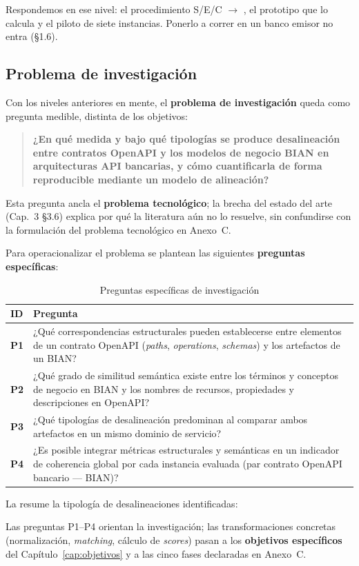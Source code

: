 Respondemos en ese nivel: el procedimiento S/E/C $\rightarrow$ \AlignmentScore{}, el prototipo
que lo calcula y el piloto de siete instancias. Ponerlo a correr en un banco emisor no entra
(§1.6).

\subsection{Problema de investigación}

Con los niveles anteriores en mente, el \textbf{problema de investigación} queda como pregunta
medible, distinta de los objetivos:

\begin{quote}
  \textbf{¿En qué medida y bajo qué tipologías se produce desalineación entre contratos OpenAPI y
  los modelos de negocio BIAN en arquitecturas API bancarias, y cómo cuantificarla de forma
  reproducible mediante un modelo de alineación?}
\end{quote}

Esta pregunta ancla el \textbf{problema tecnológico}; la brecha del estado del arte (Cap.~3 §3.6)
explica por qué la literatura aún no lo resuelve, sin confundirse con la formulación del problema
tecnológico en Anexo~C.

Para operacionalizar el problema se plantean las siguientes \textbf{preguntas específicas}:

\begin{table}[H]
  \centering
  \caption{Preguntas específicas de investigación}
  \label{tab:preguntas}
  \small
  \begin{tabular}{@{}p{}p{}@{}}
    \toprule
    \textbf{ID} & \textbf{Pregunta} \\
    \midrule
    \textbf{P1} &
    ¿Qué correspondencias estructurales pueden establecerse entre elementos de un contrato OpenAPI
    (\textit{paths}, \textit{operations}, \textit{schemas}) y los artefactos de un \ServiceDomain{}
    BIAN? \\
    \textbf{P2} &
    ¿Qué grado de similitud semántica existe entre los términos y conceptos de negocio en BIAN y los
    nombres de recursos, propiedades y descripciones en OpenAPI? \\
    \textbf{P3} &
    ¿Qué tipologías de desalineación predominan al comparar ambos artefactos en un mismo dominio de
    servicio? \\
    \textbf{P4} &
    ¿Es posible integrar métricas estructurales y semánticas en un indicador de coherencia global
    por cada instancia evaluada (par contrato OpenAPI bancario --- \ServiceDomain{} BIAN)? \\
    \bottomrule
  \end{tabular}
\end{table}

La  resume la tipología de desalineaciones identificadas:



Las preguntas P1--P4 orientan la investigación; las transformaciones concretas (normalización,
\textit{matching}, cálculo de \textit{scores}) pasan a los \textbf{objetivos específicos} del
Capítulo~\ref{cap:objetivos} y a las cinco fases declaradas en Anexo~C.
